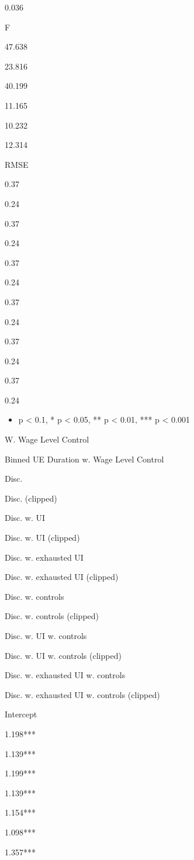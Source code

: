 0.036

F

47.638

23.816

40.199

11.165

10.232

12.314

RMSE

0.37

0.24

0.37

0.24

0.37

0.24

0.37

0.24

0.37

0.24

0.37

0.24

\begin{itemize}
\tightlist
\item
  p \textless{} 0.1, * p \textless{} 0.05, ** p \textless{} 0.01, *** p
  \textless{} 0.001
\end{itemize}

W. Wage Level Control

\label{nncmtvpjxy}
Binned UE Duration w. Wage Level Control

Disc.

Disc. (clipped)

Disc. w. UI

Disc. w. UI (clipped)

Disc. w. exhausted UI

Disc. w. exhausted UI (clipped)

Disc. w. controls

Disc. w. controls (clipped)

Disc. w. UI w. controls

Disc. w. UI w. controls (clipped)

Disc. w. exhausted UI w. controls

Disc. w. exhausted UI w. controls (clipped)

Intercept

1.198***

1.139***

1.199***

1.139***

1.154***

1.098***

1.357***

